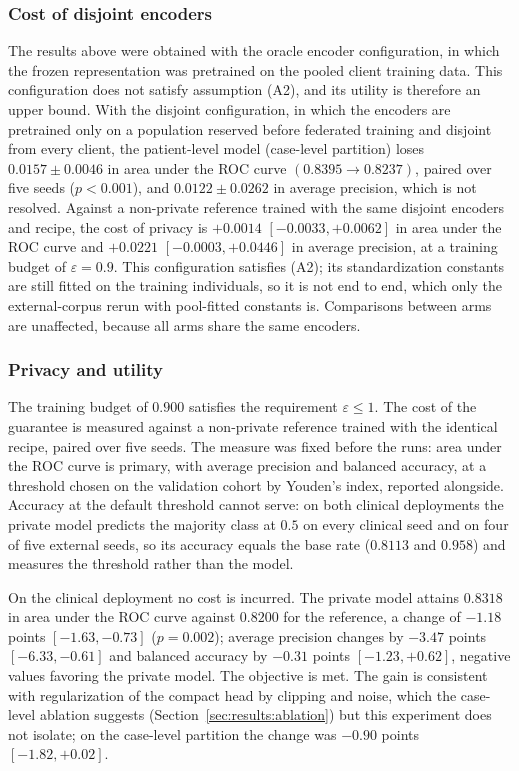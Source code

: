 \subsubsection{Cost of disjoint encoders}
The results above were obtained with the oracle encoder configuration, in which
the frozen representation was pretrained on the pooled client training data.
This configuration does not satisfy assumption (A2), and its utility is
therefore an upper bound. With the disjoint configuration, in which the
encoders are pretrained only on a population reserved before federated
training and disjoint from every client, the patient-level model (case-level partition) loses
$0.0157 \pm 0.0046$ in area under the ROC curve $(0.8395 \rightarrow 0.8237)$,
paired over five seeds ($p < 0.001$), and $0.0122 \pm 0.0262$ in average
precision, which is not resolved. Against a non-private reference trained with
the same disjoint encoders and recipe, the cost of privacy is $+0.0014$
$[-0.0033, +0.0062]$ in area under the ROC curve and $+0.0221$
$[-0.0003, +0.0446]$ in average precision, at a training budget of
$\varepsilon = 0.9$. This configuration satisfies (A2); its standardization
constants are still fitted on the training individuals, so it is not end to
end, which only the external-corpus rerun with pool-fitted constants is.
Comparisons between arms are unaffected, because all arms share the same
encoders.

\subsubsection{Privacy and utility}
\label{sec:results:privutil}
The training budget of $0.900$ satisfies the requirement $\varepsilon \le 1$.
The cost of the guarantee is measured against a non-private reference trained
with the identical recipe, paired over five seeds. The measure was fixed before
the runs: area under the ROC curve is primary, with average precision and
balanced accuracy, at a threshold chosen on the validation cohort by Youden's
index, reported alongside. Accuracy at the default threshold cannot serve: on
both clinical deployments the private model predicts the majority class at
$0.5$ on every clinical seed and on four of five external seeds, so its
accuracy equals the base rate ($0.8113$ and $0.958$) and measures the threshold rather than the model.

On the clinical deployment no cost is incurred. The private model attains
$0.8318$ in area under the ROC curve against $0.8200$ for the reference, a
change of $-1.18$ points $[-1.63, -0.73]$ ($p = 0.002$); average precision
changes by $-3.47$ points $[-6.33, -0.61]$ and balanced accuracy by $-0.31$
points $[-1.23, +0.62]$, negative values favoring the private model. The
objective is met. The gain is consistent with regularization of the compact
head by clipping and noise, which the case-level ablation suggests
(Section~\ref{sec:results:ablation}) but this experiment does not isolate; on the case-level partition the change was $-0.90$ points
$[-1.82, +0.02]$.

